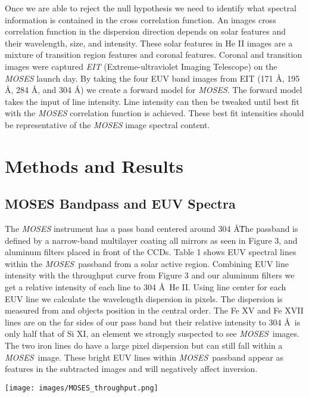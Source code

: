 \documentclass[]{aastex6}
\newcommand{\MOSES}{\textit{MOSES}}
\begin{document}
Once we are able to reject the null hypothesis we need to identify what spectral information is contained in the cross correlation function.  An images cross correlation function in the dispersion direction depends on solar features and their wavelength, size, and intensity.  These solar features in He II images are a mixture of transition region features and coronal features. Coronal and transition images were captured \textit{EIT} (Extreme-ultraviolet Imaging Telescope) on the \textit{MOSES} launch day.  By taking the four EUV band images from EIT (171 \AA , 195 \AA , 284 \AA , and 304 \AA ) we create a forward model for \textit{MOSES}.  The forward model takes the input of line intensity.  Line intensity can then be tweaked until best fit with the \textit{MOSES} correlation function is achieved. These best fit intensities should be representative of the \textit{MOSES} image spectral content.  

\section{Methods and Results}

\subsection{MOSES Bandpass and EUV Spectra}   
	The \textit{MOSES} instrument has a pass band centered around 304 \AA \. The passband is defined by a narrow-band multilayer coating all mirrors \citep{Owens2005} as seen in Figure 3, and aluminum filters placed in front of the CCDs. Table 1 shows EUV spectral lines within the \MOSES \ passband \citep{Spec98} from a solar active region. Combining EUV line intensity with the throughput curve from Figure 3 and our aluminum filters we get a relative intensity of each line to 304 \AA \ He II.  Using line center for each EUV line we calculate the wavelength dispersion in pixels.  The dispersion is measured from and objects position in the central order.  The Fe XV and Fe XVII lines are on the far sides of our pass band but their relative intensity to 304 \AA \ is only half that of Si XI, an element we strongly suspected to see \MOSES \ images.  The two iron lines do have a large pixel dispersion but can still fall within a \MOSES \ image.  These bright EUV lines within \MOSES \ passband appear as features in the subtracted images and will negatively affect inversion.


\begin{figure*}[t]
\centering
\texttt{[image: images/MOSES\_throughput.png]}
\caption{This figure from \citep{Owens2005} shows the optical throughput of the \textit{MOSES} instrument.}
\end{figure*}	
\end{document}
